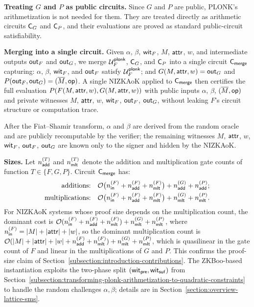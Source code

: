 \medskip
\noindent\textbf{Treating $G$ and $P$ as public circuits.}
Since $G$ and $P$ are public, PLONK's arithmetization is not needed for them.
They are treated directly as arithmetic circuits $\mathsf{C}_G$ and $\mathsf{C}_P$,
and their evaluations are proved as standard public-circuit satisfiability.

\medskip
\noindent\textbf{Merging into a single circuit.}
Given $\alpha$, $\beta$, $\mathsf{wit}_F$, $M$, $\mathsf{attr}$, $w$,
and intermediate outputs $\mathsf{out}_F$ and $\mathsf{out}_G$,
we merge $\mathcal{U}^\mathsf{plonk}_F$, $\mathsf{C}_G$, and $\mathsf{C}_P$
into a single circuit $\mathsf{C}_\mathsf{merge}$ capturing:
$\alpha$, $\beta$, $\mathsf{wit}_F$, and $\mathsf{out}_F$ satisfy $\mathcal{U}^\mathsf{plonk}_F$;
and $G(M, \mathsf{attr}, w) = \mathsf{out}_G$ and $P(\mathsf{out}_F, \mathsf{out}_G) = (\overline{M}, \mathsf{op})$.
A single NIZKAoK applied to $\mathsf{C}_\mathsf{merge}$ then certifies
the full evaluation $P(F(M, \mathsf{attr}, w), G(M, \mathsf{attr}, w))$
with public inputs $\alpha$, $\beta$, $(\overline{M}, \mathsf{op})$
and private witnesses $M$, $\mathsf{attr}$, $w$, $\mathsf{wit}_F$, $\mathsf{out}_F$, $\mathsf{out}_G$,
without leaking $F$'s circuit structure or computation trace.

After the Fiat--Shamir transform, $\alpha$ and $\beta$ are derived from
the random oracle and are publicly recomputable by the verifier;
the remaining witnesses $M$, $\mathsf{attr}$, $w$, $\mathsf{wit}_F$, $\mathsf{out}_F$, $\mathsf{out}_G$
are known only to the signer and hidden by the NIZKAoK.

\medskip
\noindent\textbf{Sizes.}
Let $n_\mathsf{add}^{(T)}$ and $n_\mathsf{mlt}^{(T)}$ denote the addition and multiplication gate counts
of function $T \in \{F, G, P\}$.
Circuit $\mathsf{C}_\mathsf{merge}$ has:
\begin{align*}
\text{additions:} \quad
&\mathcal{O}\bigl(n_\mathsf{in}^{(F)} + n_\mathsf{add}^{(F)} + n_\mathsf{mlt}^{(F)}\bigr)
+ n_\mathsf{add}^{(G)} + n_\mathsf{add}^{(P)};
\\
\text{multiplications:} \quad
&\mathcal{O}\bigl(n_\mathsf{in}^{(F)} + n_\mathsf{add}^{(F)} + n_\mathsf{mlt}^{(F)}\bigr)
+ n_\mathsf{mlt}^{(G)} + n_\mathsf{mlt}^{(P)}.
\end{align*}
For NIZKAoK systems whose proof size depends on the multiplication count,
the dominant cost is
$\mathcal{O}(n_\mathsf{in}^{(F)} + n_\mathsf{add}^{(F)} + n_\mathsf{mlt}^{(F)}) + n_\mathsf{mlt}^{(G)} + n_\mathsf{mlt}^{(P)}$,
where $n_\mathsf{in}^{(F)} = |M| + |\mathsf{attr}| + |w|$,
so the dominant multiplication count is
$\mathcal{O}(|M| + |\mathsf{attr}| + |w| + n_\mathsf{add}^{(F)} + n_\mathsf{mlt}^{(F)}) + n_\mathsf{mlt}^{(G)} + n_\mathsf{mlt}^{(P)}$,
which is quasilinear in the gate count of $F$ and linear in the multiplications of $G$ and $P$.
This confirms the proof-size claim of
Section~\ref{subsection:introduction-contributions}.
The ZKBoo-based instantiation exploits the two-phase split
$(\mathsf{wit}_\mathsf{pre}, \mathsf{wit}_\mathsf{suf})$ from
Section~\ref{subsection:transforming-plonk-arithmetization-to-quadratic-constraints}
to handle the random challenges $\alpha, \beta$;
details are in Section~\ref{section:overview-lattice-sms}.
